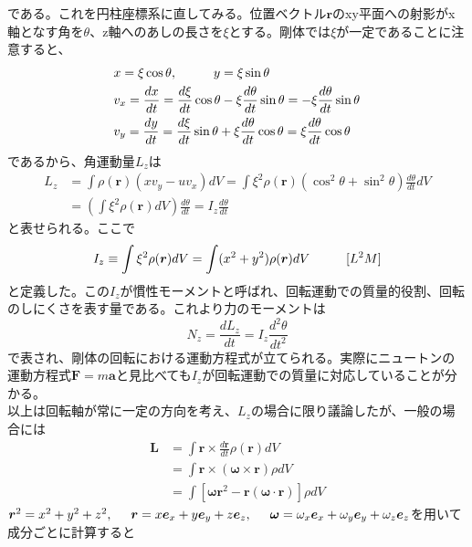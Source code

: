 \documentclass{jsarticle}
\begin{document}
である。これを円柱座標系に直してみる。位置ベクトル\(\bm{r}\)のxy平面への射影がx軸となす角を\(\theta\)、z軸へのあしの長さを\(\xi\)とする。剛体では\(\xi\)が一定であることに注意すると、
\begin{align*}
&x=\xi\cos\theta,\hspace{10mm}y=\xi\sin\theta\\
&v_{x}=\frac{dx}{dt}=\frac{d\xi}{dt}\cos\theta-\xi\frac{d\theta}{dt}\sin\theta=-\xi\frac{d\theta}{dt}\sin\theta\\
&v_{y}=\frac{dy}{dt}=\frac{d\xi}{dt}\sin\theta+\xi\frac{d\theta}{dt}\cos\theta=\xi\frac{d\theta}{dt}\cos\theta
\end{align*}
であるから、角運動量\(L_{z}\)は
\begin{align}
L_{z}&=\int\rho(\bm{r})(xv_{y}-uv_{x})dV=\int\xi^{2}\rho(\bm{r})(\cos^{2}\theta+\sin^{2}\theta)\frac{d\theta}{dt}dV\nonumber\\
&=\left(\int\xi^{2}\rho(\bm{r})dV\right)\frac{d\theta}{dt}=I_{z}\frac{d\theta}{dt}
\end{align}
と表せられる。ここで
\begin{equation}
I_{z}\equiv\int\xi^{2}\rho(\bm{r})dV=\int(x^2+y^2)\rho(\bm{r})dV\hspace{10mm}[L^{2}M]
\end{equation}
と定義した。この\(I_{z}\)が慣性モーメントと呼ばれ、回転運動での質量的役割、回転のしにくさを表す量である。これより力のモーメントは
\begin{equation}
N_{z}=\frac{dL_{z}}{dt}=I_{z}\frac{d^{2}\theta}{dt^2}
\end{equation}
で表され、剛体の回転における運動方程式が立てられる。実際にニュートンの運動方程式\(\bm{F}=m\bm{a}\)と見比べても\(I_{z}\)が回転運動での質量に対応していることが分かる。\\
以上は回転軸が常に一定の方向を考え、\(L_{z}\)の場合に限り議論したが、一般の場合には
\begin{align}
\bm{L}&=\int\bm{r}\times\frac{d\bm{r}}{dt}\rho(\bm{r})dV\nonumber\\
&=\int\bm{r}\times(\bm{\omega}\times\bm{r})\rho dV\nonumber\\
&=\int\left[\bm{\omega}\bm{r}^{2}-\bm{r}(\bm{\omega}\cdot\bm{r})\right]\rho dV
\end{align}
\(\bm{r}^{2}=x^2+y^{2}+z^{2},\hspace{5mm}\bm{r}=x\bm{e}_{x}+y\bm{e}_{y}+z\bm{e}_{z},\hspace{5mm}\bm{\omega}=\omega_{x}\bm{e}_{x}+\omega_{y}\bm{e}_{y}+\omega_{z}\bm{e}_{z}\)を用いて成分ごとに計算すると
\end{document}
